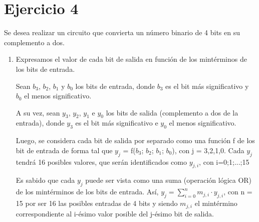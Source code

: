 \documentclass[../../informe/src/main.tex]{subfiles}
\begin{document}
\section{Ejercicio 4}
Se desea realizar un circuito que convierta un número binario de 4 bits en su complemento a dos.

\begin{enumerate}

\item Expresamos el valor de cada bit de salida en función de los mintérminos de los bits de entrada.\par
Sean $b_{3}$, $b_{2}$, $b_{1}$ y $b_{0}$ los bits de entrada, donde $b_{3}$ es el bit más significativo y $b_{0}$ el menos significativo.\par
A su vez, sean $y_{3}$, $y_{2}$, $y_{1}$ e $y_{0}$ los bits de salida (complemento a dos de la entrada), donde $y_{3}$ es el bit más significativo e $y_{0}$ el menos significativo. \par
Luego, se considera cada bit de salida por separado como una función f de los bit de entrada de forma tal que $y_{j}$ = f($b_{3}$; $b_{2}$; $b_{1}$; $b_{0}$), con j = 3,2,1,0. Cada $y_{j}$ tendrá 16 posibles valores, que serán identificados como $y_{j,i}$, con i=0;1;...;15\par
Es sabido que cada $y_{j}$ puede ser vista como una suma (operación lógica OR) de los mintérminos de los bits de entrada. 
Así, $y_{j} =\sum\limits_{i=0}^n m_{j,i}\cdot y_{j,i}$, con n = 15 por ser 16 las posibles entradas de 4 bits y siendo $m_{j,i}$ el mintérmino correspondiente al i-ésimo valor posible del j-ésimo bit de salida.\par


\end{enumerate}
\end{document}
